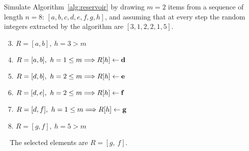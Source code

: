 \exercise

Simulate Algorithm~\ref{alg:reservoir} by drawing $m = 2$ items from a sequence
of length $n = 8$: $[a, b, c, d, e, f, g, h]$, and assuming that at every step
the random integers extracted by the algorithm are $[3, 1, 2, 2, 1, 5]$.

\solution

\begin{enumerate}[\bf a.]
  \setcounter{enumi}{2}
  \item $R = [a, b],\ h = 3 > m$
  \item $R = [a, b],\ h = 1 \le m \Longrightarrow R[h] \gets \text{\bf d}$
  \item $R = [d, b],\ h = 2 \le m \Longrightarrow R[h] \gets \text{\bf e}$
  \item $R = [d, e],\ h = 2 \le m \Longrightarrow R[h] \gets \text{\bf f}$
  \item $R = [d, f],\ h = 1 \le m \Longrightarrow R[h] \gets \text{\bf g}$
  \item $R = [g, f],\ h = 5 > m$
\end{enumerate}\
%
The selected elements are $R = [ g,\ f ]$.
